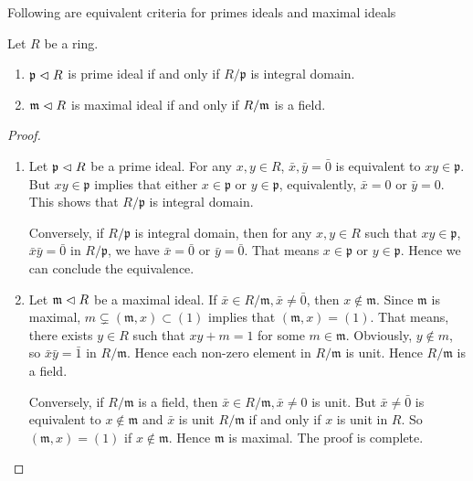 \documentclass{amsart}
\begin{document}
Following are equivalent criteria for primes ideals and maximal ideals
\begin{secprop}
	Let $R$ be a ring.
	\begin{enumerate}
		\item $\mathfrak{p} \vartriangleleft R$ is prime ideal if and only if $R/\mathfrak{p}$ is integral domain.
		\item $\mathfrak{m} \vartriangleleft R$ is maximal ideal if and only if $R/\mathfrak{m}$ is a field.
	\end{enumerate}
\end{secprop}
\begin{proof}
	\begin{enumerate}
		\item Let $\mathfrak{p} \vartriangleleft R$ be a prime ideal. For any $x,y \in R$, $\bar{x},\bar{y} = \bar{0}$ is equivalent to $xy \in \mathfrak{p}$. But $xy \in \mathfrak{p}$ implies that either $x \in \mathfrak{p}$ or $y \in \mathfrak{p}$, equivalently, $\bar{x}=0$ or $\bar{y}=0$. This shows that $R/\mathfrak{p}$ is integral domain. 
		
		Conversely, if $R/\mathfrak{p}$ is integral domain, then for any $x,y \in R$ such that $xy \in \mathfrak{p}$, $\bar{x} \bar{y} = \bar{0}$ in $R/\mathfrak{p}$, we have $\bar{x}=\bar{0}$ or $\bar{y} = \bar{0}$. That means $x \in \mathfrak{p}$ or $y \in \mathfrak{p}$. Hence we can conclude the equivalence.
		\item Let $\mathfrak{m} \vartriangleleft R$ be a maximal ideal. If $ \bar{x} \in R/\mathfrak{m}, \bar{x} \neq \bar{0}$, then $x \notin \mathfrak{m}$. Since $\mathfrak{m}$ is maximal, $m \subsetneq (\mathfrak{m}, x) \subset (1)$ implies that $(\mathfrak{m},x) = (1)$. That means, there exists $y \in R$ such that $xy +m=1 $ for some $m \in \mathfrak{m}$. Obviously, $y \notin m$, so $\bar{x} \bar{y} = \bar{1}$ in $R/\mathfrak{m}$. Hence each non-zero element in $R/\mathfrak{m}$ is unit. Hence $R/\mathfrak{m}$ is a field.
		
		Conversely, if $R/\mathfrak{m}$ is a field, then $\bar{x} \in R/\mathfrak{m}, \bar{x} \neq 0$ is unit. But $\bar{x} \neq \bar{0}$ is equivalent to $x \notin \mathfrak{m}$ and $\bar{x}$ is unit $R/\mathfrak{m}$ if and only if $x$ is unit in $R$. So $(\mathfrak{m}, x) = (1)$ if $x \notin \mathfrak{m}$. Hence $\mathfrak{m}$ is maximal. The proof is complete. 
	\end{enumerate}
\end{proof}
\end{document}
